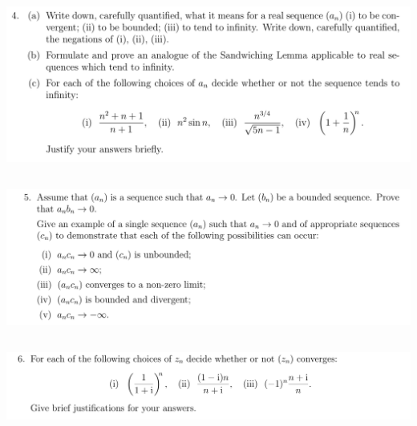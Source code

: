 \documentclass[12pt]{article}
\begin{document}
\newpage
\subsection{}
\begin{mdframed}
\includegraphics[width=400pt]{img/oxford-M2-analysis-I-3-4.png}
\end{mdframed}

\newpage
\subsection{}
\begin{mdframed}
\includegraphics[width=400pt]{img/oxford-M2-analysis-I-3-5.png}
\end{mdframed}

\newpage
\subsection{}
\begin{mdframed}
\includegraphics[width=400pt]{img/oxford-M2-analysis-I-3-6.png}
\end{mdframed}

\newpage
\end{document}
